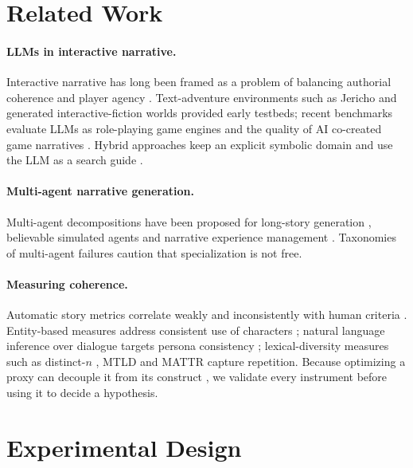 \documentclass[11pt]{article}
\begin{document}
\section{Related Work}
\paragraph{LLMs in interactive narrative.} Interactive narrative has long been framed as a problem of balancing authorial coherence and player agency \citep{riedl2013interactive}. Text-adventure environments such as Jericho \citep{hausknecht2020jericho} and generated interactive-fiction worlds \citep{ammanabrolu2020bringing} provided early testbeds; recent benchmarks evaluate LLMs as role-playing game engines \citep{yu2025rpgbench} and the quality of AI co-created game narratives \citep{valdivia2025evaluating}. Hybrid approaches keep an explicit symbolic domain and use the LLM as a search guide \citep{farrell2025llm}.

\paragraph{Multi-agent narrative generation.} Multi-agent decompositions have been proposed for long-story generation \citep{xia2025storywriter}, believable simulated agents \citep{park2023generative} and narrative experience management \citep{ware2023multiagent}. Taxonomies of multi-agent failures \citep{cemri2025why} caution that specialization is not free.

\paragraph{Measuring coherence.} Automatic story metrics correlate weakly and inconsistently with human criteria \citep{chhun2022human}. Entity-based measures address consistent use of characters \citep{papalampidi2022entities}; natural language inference over dialogue targets persona consistency \citep{welleck2019dnli}; lexical-diversity measures such as distinct-$n$ \citep{li2016diversity}, MTLD \citep{mccarthy2010mtld} and MATTR \citep{covington2010mattr} capture repetition. Because optimizing a proxy can decouple it from its construct \citep{manheim2019goodhart}, we validate every instrument before using it to decide a hypothesis.

\section{Experimental Design}\label{sec:design}
\end{document}
